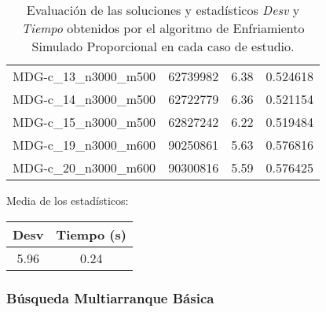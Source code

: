 \documentclass{article}
\begin{document}
\begin{table}[H]
\begin{tabular}{|cccc|}
		MDG-c\_13\_n3000\_m500 & 62739982 & 6.38 & 0.524618\\
		MDG-c\_14\_n3000\_m500 & 62722779 & 6.36 & 0.521154\\
		MDG-c\_15\_n3000\_m500 & 62827242 & 6.22 & 0.519484\\
		MDG-c\_19\_n3000\_m600 & 90250861 & 5.63 & 0.576816\\
		MDG-c\_20\_n3000\_m600 & 90300816 & 5.59 & 0.576425\\
		\hline
	\end{tabular}
	\caption{Evaluación de las soluciones y estadísticos \emph{Desv} y \emph{Tiempo} obtenidos por el algoritmo de Enfriamiento Simulado Proporcional en cada caso de estudio.}
	\label{tab:es-proporcional}
\end{table}

Media de los estadísticos:
\begin{table}[H]
	\centering
	\begin{tabular}{|cc|}
		\hline
		Desv & Tiempo (s)\\ \hline
		5.96 & 0.24 \\
		\hline
	\end{tabular}
\end{table}

\pagebreak

\subsubsection*{Búsqueda Multiarranque Básica}
\end{document}
